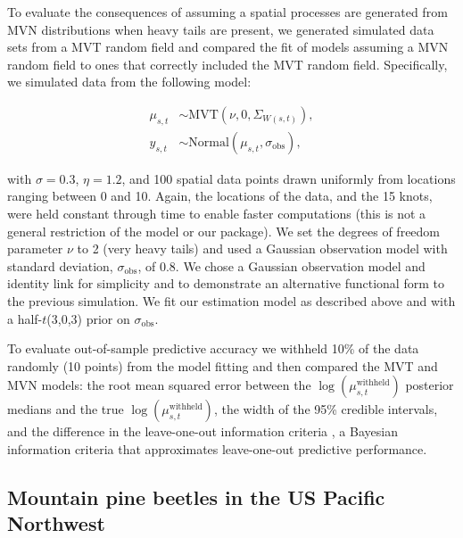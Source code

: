\documentclass[12pt,english]{article}
\begin{document}
\begin{spacing}{1.9}
To evaluate the consequences of assuming a spatial processes are generated from MVN
distributions when heavy tails are present, we generated simulated
data sets from a MVT random field and compared the fit of models assuming a
MVN random field to ones that correctly included the MVT random field. Specifically, we
simulated data from the following model:

\begin{align}
  \mu_{s,t} &\sim \mathrm{MVT}\left(\nu, 0, \Sigma_{W(s,t)}\right),\\
  y_{s,t} &\sim \mathrm{Normal} \left(\mu_{s,t}, \sigma_{\mathrm{obs}} \right),
\end{align}

\noindent with $\sigma = 0.3$, $\eta = 1.2$, and 100 spatial data points drawn uniformly
from locations ranging between 0 and 10. Again, the locations
of the data, and the 15 knots, were held constant through time to enable faster
computations (this is not a general restriction of the model or our package).
We set the degrees of freedom parameter $\nu$ to 2 (very heavy tails) and used a
Gaussian observation model with standard deviation, $\sigma_{\mathrm{obs}}$, of
0.8. We chose a Gaussian observation
model and identity link for simplicity and to demonstrate an alternative
functional form to the previous simulation. We fit our estimation model as
described above and with a half-$t$(3,0,3) prior on $\sigma_{\mathrm{obs}}$.

To evaluate out-of-sample predictive accuracy we withheld
10\% of the data randomly (10 points) from the model fitting and then compared 
the MVT and MVN models:
the root mean squared error
between the $\log(\mu^{\mathrm{withheld}}_{s,t})$
posterior medians and the true $\log\left(\mu^{\mathrm{withheld}}_{s,t}\right)$,
the width of the 95\% credible intervals,
and the difference in the leave-one-out information criteria
\citep[LOOIC;][]{vehtari2016},
a Bayesian information criteria that approximates
leave-one-out predictive performance.

\subsection{Mountain pine beetles in the US Pacific Northwest}


\end{spacing}
\end{document}
